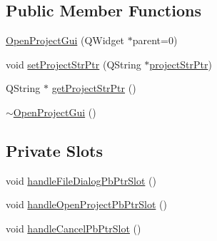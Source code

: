 \subsection*{Public Member Functions}
\begin{DoxyCompactItemize}
\item 
\hyperlink{class_open_project_gui_aaff1da3ebc21a640e891e09cd6c66a7a}{Open\-Project\-Gui} (Q\-Widget $\ast$parent=0)
\item 
void \hyperlink{class_open_project_gui_a7d0b78feb03da8d20d572107006dbb88}{set\-Project\-Str\-Ptr} (Q\-String $\ast$\hyperlink{class_open_project_gui_aadab89933dc3fe2a0bbdb1f1b7e886b7}{project\-Str\-Ptr})
\item 
Q\-String $\ast$ \hyperlink{class_open_project_gui_aa26ced8181a1e103229b08cfa94c19be}{get\-Project\-Str\-Ptr} ()
\item 
\hyperlink{class_open_project_gui_a606b0fe177b53da733484688b9ac810b}{$\sim$\-Open\-Project\-Gui} ()
\end{DoxyCompactItemize}
\subsection*{Private Slots}
\begin{DoxyCompactItemize}
\item 
void \hyperlink{class_open_project_gui_aaacc3341ba7d0bbb9bdebc3b632ef3bc}{handle\-File\-Dialog\-Pb\-Ptr\-Slot} ()
\item 
void \hyperlink{class_open_project_gui_abc7d2b7582449e5552a0ee0cbf54a3a9}{handle\-Open\-Project\-Pb\-Ptr\-Slot} ()
\item 
void \hyperlink{class_open_project_gui_ad5b20cfbb8e0f9d0c0c04dd9c4666b8f}{handle\-Cancel\-Pb\-Ptr\-Slot} ()
\end{DoxyCompactItemize}
